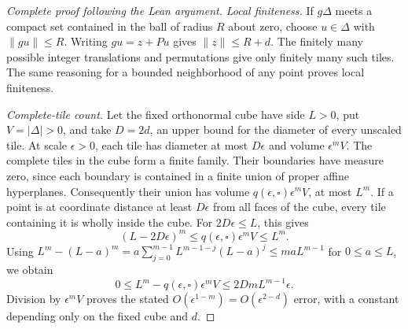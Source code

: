 \begin{proof}[Complete proof following the Lean argument]
\emph{Local finiteness.}
If \(g\Delta\) meets a compact set contained in the ball of radius \(R\)
about zero, choose \(u\in\Delta\) with \(\|g u\|\le R\). Writing
\(g u=z+P u\) gives \(\|z\|\le R+d\).
The finitely many possible integer translations and permutations give
only finitely many such tiles. The same reasoning for a bounded
neighborhood of any point proves local finiteness.

\emph{Complete-tile count.}
Let the fixed orthonormal cube have side \(L>0\), put \(V=|\Delta|>0\),
and take \(D=2d\), an upper bound for the diameter of every unscaled tile.
At scale \(\epsilon>0\), each tile has diameter at most \(D\epsilon\)
and volume \(\epsilon^m V\).
The complete tiles in the cube form a finite family.
Their boundaries have measure zero, since each boundary is contained in a
finite union of proper affine hyperplanes. Consequently their union has
volume \(q(\epsilon,\square)\epsilon^m V\), at most \(L^m\).
If a point is at coordinate distance at least \(D\epsilon\) from all
faces of the cube, every tile containing it is wholly inside the cube.
For \(2D\epsilon\le L\), this gives
\[
 (L-2D\epsilon)^m
       \le q(\epsilon,\square)\epsilon^m V\le L^m.
\]
Using
\(L^m-(L-a)^m
 =a\sum_{j=0}^{m-1}L^{m-1-j}(L-a)^j\le maL^{m-1}\)
for \(0\le a\le L\), we obtain
\[
 0\le L^m-q(\epsilon,\square)\epsilon^m V
       \le 2DmL^{m-1}\epsilon.
\]
Division by \(\epsilon^m V\) proves the stated
\(O(\epsilon^{1-m})=O(\epsilon^{2-d})\) error, with a constant depending
only on the fixed cube and \(d\).
\end{proof}

